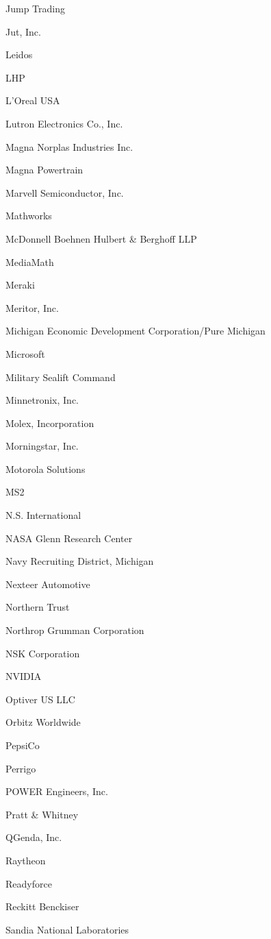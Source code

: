 \documentclass[twoside]{article}
\begin{document}
\begin{center}
\begin{multicols}{5}
\begin{FlushLeft}
\begin{compactitem}
\item Jump Trading
\item Jut, Inc.
\item Leidos
\item LHP
\item L'Oreal USA
\item Lutron Electronics Co., Inc.
\item Magna Norplas Industries Inc.
\item Magna Powertrain
\item Marvell Semiconductor, Inc.
\item Mathworks
\item McDonnell Boehnen Hulbert \& Berghoff LLP
\item MediaMath
\item Meraki
\item Meritor, Inc.
\item Michigan Economic Development Corporation/Pure Michigan
\item Microsoft
\item Military Sealift Command
\item Minnetronix, Inc.
\item Molex, Incorporation
\item Morningstar, Inc.
\item Motorola Solutions
\item MS2
\item N.S. International
\item NASA Glenn Research Center
\item Navy Recruiting District, Michigan
\item Nexteer Automotive
\item Northern Trust
\item Northrop Grumman Corporation
\item NSK Corporation
\item NVIDIA
\item Optiver US LLC
\item Orbitz Worldwide
\item PepsiCo
\item Perrigo
\item POWER Engineers, Inc.
\item Pratt \& Whitney
\item QGenda, Inc.
\item Raytheon
\item Readyforce
\item Reckitt Benckiser
\item Sandia National Laboratories

\end{compactitem}
\end{FlushLeft}
\end{multicols}
\end{center}
\end{document}
